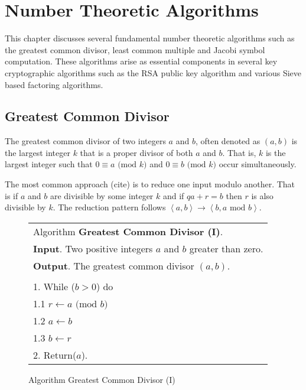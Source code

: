 \documentclass[b5paper]{book}
\begin{document}
\chapter{Number Theoretic Algorithms}
This chapter discusses several fundamental number theoretic algorithms such as the greatest common divisor, least common multiple and Jacobi 
symbol computation.  These algorithms arise as essential components in several key cryptographic algorithms such as the RSA public key algorithm and
various Sieve based factoring algorithms.

\section{Greatest Common Divisor}
The greatest common divisor of two integers $a$ and $b$, often denoted as $(a, b)$ is the largest integer $k$ that is a proper divisor of
both $a$ and $b$.  That is, $k$ is the largest integer such that $0 \equiv a \mbox{ (mod }k\mbox{)}$ and $0 \equiv b \mbox{ (mod }k\mbox{)}$ occur
simultaneously.

The most common approach (cite) is to reduce one input modulo another.  That is if $a$ and $b$ are divisible by some integer $k$ and if $qa + r = b$ then
$r$ is also divisible by $k$.  The reduction pattern follows $\left < a , b \right > \rightarrow \left < b, a \mbox{ mod } b \right >$.  

\newpage\begin{figure}[!here]
\begin{small}
\begin{center}
\begin{tabular}{l}
\hline Algorithm \textbf{Greatest Common Divisor (I)}. \\
\textbf{Input}.   Two positive integers $a$ and $b$ greater than zero. \\
\textbf{Output}.  The greatest common divisor $(a, b)$.  \\
\hline \\
1.  While ($b > 0$) do \\
\hspace{3mm}1.1  $r \leftarrow a \mbox{ (mod }b\mbox{)}$ \\
\hspace{3mm}1.2  $a \leftarrow b$ \\
\hspace{3mm}1.3  $b \leftarrow r$ \\
2.  Return($a$). \\
\hline
\end{tabular}
\end{center}
\end{small}
\caption{Algorithm Greatest Common Divisor (I)}
\label{fig:gcd1}
\end{figure}
\end{document}
